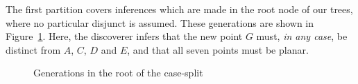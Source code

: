 The first partition covers inferences which are made in the root node of our trees, where no particular disjunct is assumed. These generations are shown in Figure~\ref{fig:RootGenerations}. Here, the discoverer infers that the new point $G$ must, \emph{in any case}, be distinct from $A$, $C$, $D$ and $E$, and that all seven points must be planar. 

\begin{figure}
\caption{Generations in the root of the case-split}
\label{fig:RootGenerations}
\end{figure}

